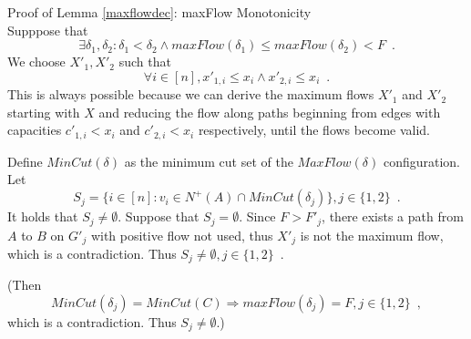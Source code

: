 \begin{sepproof}{Proof of Lemma \ref{maxflowdec}: maxFlow Monotonicity} \ \\
  Supppose that
  \begin{equation*}
    \exists \delta_1, \delta_2 : \delta_1 < \delta_2 \wedge maxFlow\left(\delta_1\right) \leq maxFlow\left(\delta_2\right)
    < F \enspace.
  \end{equation*}
  We choose $X'_1, X'_2$ such that
  \begin{equation*}
    \forall i \in [n], x'_{1, i} \leq x_i \wedge x'_{2, i} \leq x_i \enspace.
  \end{equation*}
  This is always possible because we can derive the maximum flows $X'_1$ and $X'_2$ starting with $X$ and reducing the flow
  along paths beginning from edges with capacities $c'_{1,i} < x_i$ and $c'_{2,i} < x_i$ respectively, until the flows become
  valid.

  Define $MinCut\left(\delta\right)$ as the minimum cut set of the $MaxFlow\left(\delta\right)$ configuration. Let
  \begin{equation*}
    S_j = \{i \in [n] : v_i \in N^{+}\left(A\right) \cap MinCut\left(\delta_j\right)\}, j \in \{1, 2\} \enspace.
  \end{equation*}
  It holds that $S_j \neq \emptyset$. Suppose that $S_j = \emptyset$. Since $F > F'_j$, there exists a path from $A$ to $B$
  on $G'_j$ with positive flow not used, thus $X'_j$ is not the maximum flow, which is a contradiction. Thus
  $S_j \neq \emptyset, j \in \{1, 2\} \enspace.$

  (Then \begin{equation*}
    MinCut\left(\delta_j\right) = MinCut\left(C\right) \Rightarrow maxFlow\left(\delta_j\right) = F, j \in \{1, 2\}
    \enspace,
  \end{equation*}
  which is a contradiction. Thus $S_j \neq \emptyset$.)


\end{sepproof}
